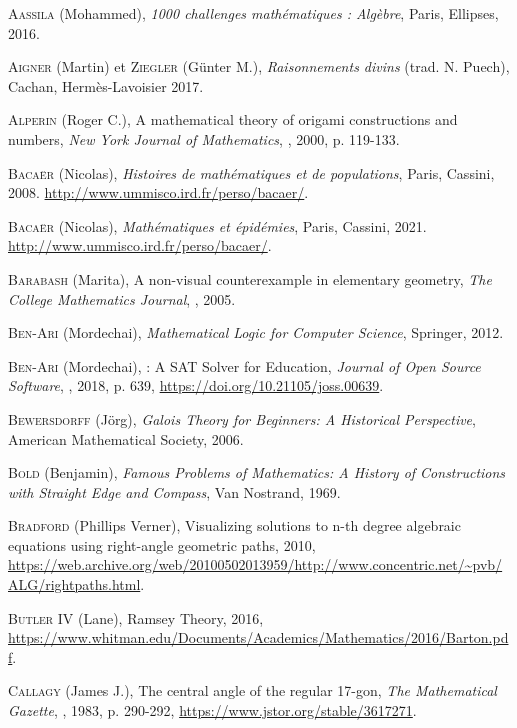 \begin{thebibliography}{99}

\textsc{Aassila} (Mohammed), \emph{1000 challenges mathématiques : Algèbre}, Paris, Ellipses, 2016.

  \textsc{Aigner} (Martin) et \textsc{Ziegler} (G\"{u}nter M.), \emph{Raisonnements divins} (trad. N. Puech), Cachan, Hermès-Lavoisier 2017.

  \textsc{Alperin} (Roger C.), \og A mathematical theory of origami constructions and numbers\fg, \emph{New York Journal of Mathematics}, , 2000, p. 119-133.

  \textsc{Bacaër} (Nicolas), \emph{Histoires de mathématiques et de populations}, Paris, Cassini, 2008. \url{http://www.ummisco.ird.fr/perso/bacaer/}.

  \textsc{Bacaër} (Nicolas), \emph{Mathématiques et épidémies}, Paris, Cassini, 2021. \url{http://www.ummisco.ird.fr/perso/bacaer/}.


  \textsc{Barabash} (Marita), \og A non-visual counterexample in elementary geometry\fg, \emph{The College Mathematics Journal}, , 2005.

  \textsc{Ben-Ari} (Mordechai), \emph{Mathematical Logic for Computer Science}, Springer, 2012.


  \textsc{Ben-Ari} (Mordechai), : A {SAT} Solver for Education\fg, \emph{Journal of Open Source Software}, , 2018, p. 639, \url{https://doi.org/10.21105/joss.00639}.


  \textsc{Bewersdorff} (J\"{o}rg), \emph{Galois Theory for Beginners: A Historical Perspective}, American Mathematical Society, 2006.

  \textsc{Bold} (Benjamin), \emph{Famous Problems of Mathematics: A History of Constructions with Straight Edge and Compass}, Van Nostrand, 1969.

  \textsc{Bradford} (Phillips Verner), \og Visualizing solutions to n-th degree algebraic equations using right-angle geometric paths\fg, 2010, \url{https://web.archive.org/web/20100502013959/http://www.concentric.net/~pvb/ALG/rightpaths.html}.


  \textsc{Butler IV} (Lane), \og Ramsey Theory\fg, 2016, \url{https://www.whitman.edu/Documents/Academics/Mathematics/2016/Barton.pdf}.

  \textsc{Callagy} (James J.), \og The central angle of the regular 17-gon\fg, \emph{The Mathematical Gazette}, , 1983, p. 290-292, \url{https://www.jstor.org/stable/3617271}.


\end{thebibliography}
